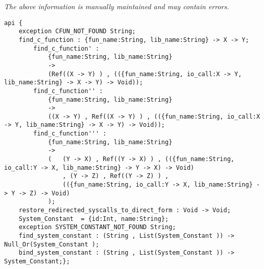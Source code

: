 \label{api:Mythryl\_Callable\_C\_Library\_Interface}

{\tiny \it The above information is manually maintained and may contain errors.}
\begin{verbatim}
api {
    exception CFUN_NOT_FOUND String;
    find_c_function : {fun_name:String, lib_name:String} -> X -> Y;
        find_c_function' :
            {fun_name:String, lib_name:String}
            ->
            (Ref((X -> Y) ) , (({fun_name:String, io_call:X -> Y, lib_name:String} -> X -> Y) -> Void));
        find_c_function'' :
            {fun_name:String, lib_name:String}
            ->
            ((X -> Y) , Ref((X -> Y) ) , (({fun_name:String, io_call:X -> Y, lib_name:String} -> X -> Y) -> Void));
        find_c_function''' :
            {fun_name:String, lib_name:String}
            ->
            (   (Y -> X) , Ref((Y -> X) ) , (({fun_name:String, io_call:Y -> X, lib_name:String} -> Y -> X) -> Void)
                , (Y -> Z) , Ref((Y -> Z) ) ,
                (({fun_name:String, io_call:Y -> X, lib_name:String} -> Y -> Z) -> Void)
            );
    restore_redirected_syscalls_to_direct_form : Void -> Void;
    System_Constant  = {id:Int, name:String};
    exception SYSTEM_CONSTANT_NOT_FOUND String;
    find_system_constant : (String , List(System_Constant )) -> Null_Or(System_Constant );
    bind_system_constant : (String , List(System_Constant )) -> System_Constant;};
\end{verbatim}
